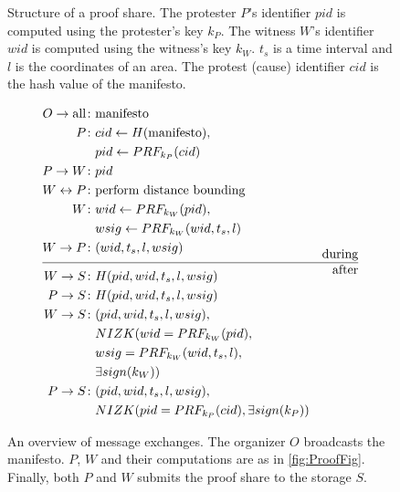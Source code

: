 \begin{columns}[t]
\begin{column}{0.32\linewidth}
\begin{figure}
\begin{tikzpicture}[%
        -Latex,
        item/.style={rectangle,draw},
        edge from parent/.style={},
        ]
      \end{tikzpicture}
      \caption{%
        Structure of a proof share.
        The protester \(P\)'s identifier \(pid\) is computed using the protester's 
        key \(k_P\).
        The witness \(W\)'s identifier \(wid\) is computed using the witness's key 
        \(k_W\).
        \(t_s\) is a time interval and \(l\) is the coordinates of an area.
        The protest (cause) identifier \(cid\) is the hash value of the manifesto.
      }%
      \label{ProofShare}
    \end{figure}%

    \begin{figure}
      \centering
      \begin{minipage}{\linewidth}
        \begin{align*}
          O\to \text{all}\colon & \text{manifesto} \\
          P\colon & cid\gets H(\text{manifesto}), \\
          & pid\gets PRF_{k_P}(cid) \\
          P\to W\colon & pid \\
          W\leftrightarrow P\colon & \text{perform distance bounding} \\
          W\colon & wid\gets PRF_{k_W}(pid), \\
          & wsig\gets PRF_{k_W}(wid, t_s, l) \\
          W\to P\colon & (wid, t_s, l, wsig) \\[-1em]
          && \text{during} \\ \hline && \text{after} \\[-1em]
          W\to S\colon & H(pid, wid, t_s, l, wsig) \\
          P\to S\colon & H(pid, wid, t_s, l, wsig) \\
          W\to S\colon & (pid, wid, t_s, l, wsig),\\
          & NIZK(wid = PRF_{k_W}(pid), \\
            & wsig = PRF_{k_W}(wid, t_s, l), \\
            & \exists sign(k_W)) \\
          P\to S\colon & (pid, wid, t_s, l, wsig),\\
          & NIZK(pid = PRF_{k_P}(cid), \exists sign(k_P))
        \end{align*}
      \end{minipage}
      \caption{%
        An overview of message exchanges.
        The organizer \(O\) broadcasts the manifesto.
        \(P\), \(W\) and their computations are as in \cref{fig:ProofFig}.
        Finally, both \(P\) and \(W\) submits the proof share to the storage \(S\).
      }%
      \label{Protocol}
    \end{figure}


\end{column}
\end{columns}
